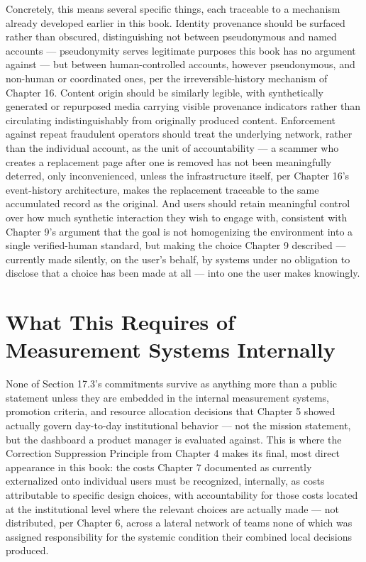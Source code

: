 \documentclass[12pt,a4paper]{book}
\begin{document}
Concretely, this means several specific things, each traceable to a mechanism already developed earlier in this book. Identity provenance should be surfaced rather than obscured, distinguishing not between pseudonymous and named accounts — pseudonymity serves legitimate purposes this book has no argument against — but between human-controlled accounts, however pseudonymous, and non-human or coordinated ones, per the irreversible-history mechanism of Chapter 16. Content origin should be similarly legible, with synthetically generated or repurposed media carrying visible provenance indicators rather than circulating indistinguishably from originally produced content. Enforcement against repeat fraudulent operators should treat the underlying network, rather than the individual account, as the unit of accountability — a scammer who creates a replacement page after one is removed has not been meaningfully deterred, only inconvenienced, unless the infrastructure itself, per Chapter 16's event-history architecture, makes the replacement traceable to the same accumulated record as the original. And users should retain meaningful control over how much synthetic interaction they wish to engage with, consistent with Chapter 9's argument that the goal is not homogenizing the environment into a single verified-human standard, but making the choice Chapter 9 described — currently made silently, on the user's behalf, by systems under no obligation to disclose that a choice has been made at all — into one the user makes knowingly.

\section{What This Requires of Measurement Systems Internally}

None of Section 17.3's commitments survive as anything more than a public statement unless they are embedded in the internal measurement systems, promotion criteria, and resource allocation decisions that Chapter 5 showed actually govern day-to-day institutional behavior — not the mission statement, but the dashboard a product manager is evaluated against. This is where the Correction Suppression Principle from Chapter 4 makes its final, most direct appearance in this book: the costs Chapter 7 documented as currently externalized onto individual users must be recognized, internally, as costs attributable to specific design choices, with accountability for those costs located at the institutional level where the relevant choices are actually made — not distributed, per Chapter 6, across a lateral network of teams none of which was assigned responsibility for the systemic condition their combined local decisions produced.
\end{document}
